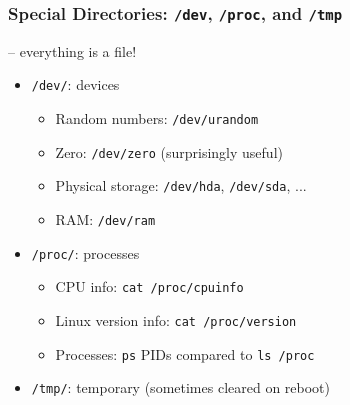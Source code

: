 \documentclass{beamer} \usetheme{Madrid}
\begin{document}
\begin{frame}
    \frametitle{Special Directories: \texttt{/dev}, \texttt{/proc}, and \texttt{/tmp}}
     -- everything is a file!
    \vspace{1cm}
    \begin{itemize}
        \item \texttt{/dev/}: devices
            \begin{itemize}
                \item Random numbers: \texttt{/dev/urandom}
                \item Zero: \texttt{/dev/zero} (surprisingly useful)
                \item Physical storage: \texttt{/dev/hda}, \texttt{/dev/sda}, ...
                \item RAM: \texttt{/dev/ram}
            \end{itemize}
        \item \texttt{/proc/}: processes
            \begin{itemize}
                \item CPU info: \texttt{cat /proc/cpuinfo}
                \item Linux version info: \texttt{cat /proc/version}
                \item Processes: \texttt{ps} PIDs compared to \texttt{ls /proc}
            \end{itemize}
        \item \texttt{/tmp/}: temporary (sometimes cleared on reboot)
    \end{itemize}
\end{frame}
\end{document}
